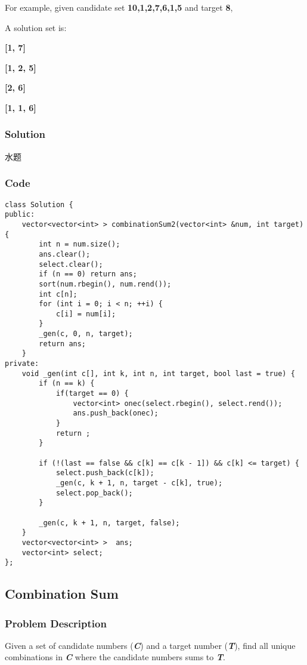\documentclass[courier]{article}
\begin{document}
\begin{CJK*}{UTF8}{gkai}
For example, given candidate set \textbf{10,1,2,7,6,1,5} and target \textbf{8}, 


A solution set is: 


\textbf{[1, 7]} 


\textbf{[1, 2, 5]} 


\textbf{[2, 6]} 


\textbf{[1, 1, 6]}



\subsubsection*{Solution}
水题

\subsubsection*{Code}
\begin{lstlisting}
class Solution {
public:
    vector<vector<int> > combinationSum2(vector<int> &num, int target) {
        int n = num.size();
        ans.clear();
        select.clear();
        if (n == 0) return ans;
        sort(num.rbegin(), num.rend());
        int c[n];
        for (int i = 0; i < n; ++i) {
            c[i] = num[i];
        }
        _gen(c, 0, n, target);
        return ans;
    }
private:
    void _gen(int c[], int k, int n, int target, bool last = true) {
        if (n == k) {
            if(target == 0) {
                vector<int> onec(select.rbegin(), select.rend());
                ans.push_back(onec);
            }
            return ;
        }
        
        if (!(last == false && c[k] == c[k - 1]) && c[k] <= target) {
            select.push_back(c[k]);
            _gen(c, k + 1, n, target - c[k], true);
            select.pop_back();
        }
        
        _gen(c, k + 1, n, target, false);
    }
    vector<vector<int> >  ans;
    vector<int> select;
}; 
\end{lstlisting}


\subsection{ Combination Sum }

\subsubsection*{Problem Description}
Given a set of candidate numbers (\textbf{\emph{C}}) and a target number (\textbf{\emph{T}}), find all unique combinations in \textbf{\emph{C}} where the candidate numbers sums to \textbf{\emph{T}}.


\end{CJK*}
\end{document}
